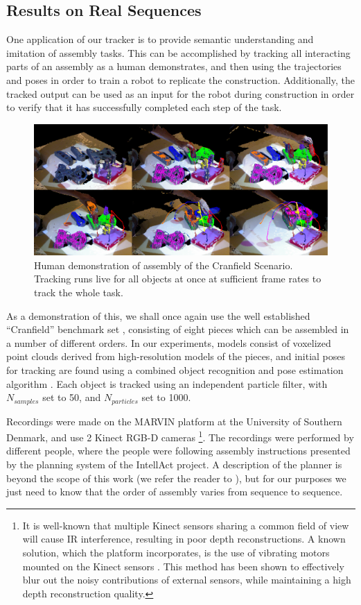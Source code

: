 \subsection{Results on Real Sequences}
One application of our tracker is to provide semantic understanding and imitation of assembly tasks. This can be accomplished by tracking all interacting parts of an assembly as a human demonstrates, and then using the trajectories and poses in order to train a robot to replicate the construction. Additionally, the tracked output can be used as an input for the robot during construction in order to verify that it has successfully completed each step of the task. 

\begin{figure}[!ht]
  \centering
  \includegraphics[width=1.0\textwidth]{figures/Tracking/HumanMontageSmall.pdf}
  \caption[Human demonstration of assembly of the Cranfield Scenario.]{Human demonstration of assembly of the Cranfield Scenario. Tracking runs live for all objects at once at sufficient frame rates to track the whole task.}
  \label{fig:Tracking_Montage}
\end{figure}

As a demonstration of this, we shall once again use the well established ``Cranfield'' benchmark set \cite{Collins1985}, consisting of eight pieces which can be assembled in a number of different orders. In our experiments, models consist of voxelized point clouds derived from high-resolution models of the pieces, and initial poses for tracking are found using a combined object recognition and pose estimation algorithm \cite{Buch_CVPR2014}. Each object is tracked using an independent particle filter, with $N_{samples}$ set to 50, and $N_{particles}$ set to 1000. 

Recordings were made on the MARVIN platform at the University of Southern Denmark, and use 2 Kinect RGB-D cameras \footnote{It is well-known that multiple Kinect sensors sharing a common field of view will cause IR interference, resulting in poor depth reconstructions. A known solution, which the platform incorporates, is the use of vibrating motors mounted on the Kinect sensors \cite{Butler2012}. This method has been shown to effectively blur out the noisy contributions of external sensors, while maintaining a high depth reconstruction quality.}. The recordings were performed by different people, where the people were following assembly instructions presented by the planning system of the IntellAct project. A description of the planner is beyond the scope of this work (we refer the reader to \cite{Rossman_ICRA2014}), but for our purposes we just need to know that the order of assembly varies from sequence to sequence. 

